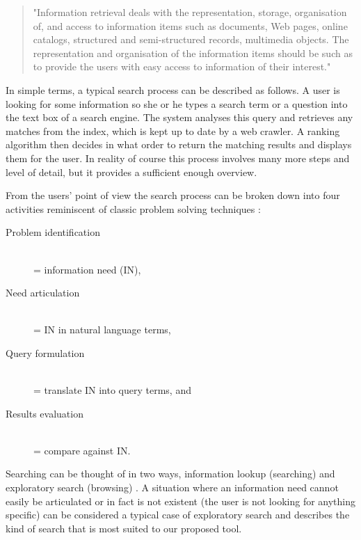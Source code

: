 
\pagestyle{fancy}

\begin{quote}
"Information retrieval deals with the representation, storage, organisation of, and access to information items such as documents, Web pages, online catalogs, structured and semi-structured records, multimedia objects. The representation and organisation of the information items should be such as to provide the users with easy access to information of their interest." \citep{Baeza-Yates2011}
\end{quote}

In simple terms, a typical search process can be described as follows. A user is looking for some information so she or he types a search term or a question into the text box of a search engine. The system analyses this query and retrieves any matches from the index, which is kept up to date by a web crawler. A ranking algorithm then decides in what order to return the matching results and displays them for the user. In reality of course this process involves many more steps and level of detail, but it provides a sufficient enough overview.

From the users' point of view the search process can be broken down into four activities \citep{Sutcliffe1998} reminiscent of classic problem solving techniques \citep{Polya1957}:

\begin{description}
\item [Problem identification] \hfill \\ = information need (IN),
\item [Need articulation] \hfill \\ = IN in natural language terms,
\item [Query formulation] \hfill \\ = translate IN into query terms, and
\item [Results evaluation] \hfill \\ = compare against IN.
\end{description}

Searching can be thought of in two ways, information lookup (searching) and exploratory search (browsing) \citep{DeVries1993,Marchionini2006}. A situation where an information need cannot easily be articulated or in fact is not existent (the user is not looking for anything specific) can be considered a typical case of exploratory search and describes the kind of search that is most suited to our proposed tool.

